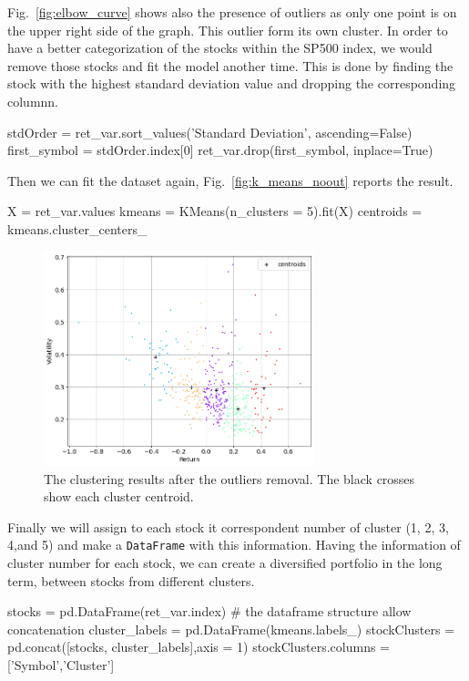 Fig.~\ref{fig:elbow_curve} shows also the presence of outliers as only one point is on the upper right side of the graph. This outlier form its own cluster. In order to have a better categorization of the stocks within the SP500 index, we would remove those stocks and fit the model another time.
This is done by finding the stock with the highest standard deviation value and dropping the corresponding columnn.
 
\begin{ipython}
stdOrder = ret_var.sort_values('Standard Deviation', ascending=False)
first_symbol = stdOrder.index[0]
ret_var.drop(first_symbol, inplace=True)
\end{ipython}
Then we can fit the dataset again, Fig.~\ref{fig:k_means_noout} reports the result.

\begin{ipython}
X = ret_var.values
kmeans = KMeans(n_clusters = 5).fit(X)
centroids = kmeans.cluster_centers_
\end{ipython}
 
\begin{figure}
\centering
\includegraphics[width=0.7\textwidth]{figures/k_means_noout}
\caption{The clustering results after the outliers removal. The black crosses show each cluster centroid.}
\label{fig:K_means_noout}
\end{figure}
  
Finally we will assign to each stock it correspondent number of cluster (1, 2, 3, 4,and 5) and make a \texttt{DataFrame} with this information. Having the information of cluster number for each stock, we can create a diversified portfolio in the long term, between stocks from different clusters.

\begin{ipython} 
stocks = pd.DataFrame(ret_var.index) # the dataframe structure allow concatenation
cluster_labels = pd.DataFrame(kmeans.labels_)
stockClusters = pd.concat([stocks, cluster_labels],axis = 1)
stockClusters.columns = ['Symbol','Cluster']
\end{ipython}
 
